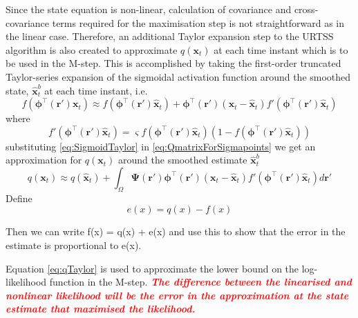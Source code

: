 \documentclass[]{article}
\newcommand{\dean}[1]{\textsf{\emph{\textbf{\textcolor{red}{#1}}}}}
\begin{document}
Since the state equation is non-linear,  calculation of covariance and  cross-covariance terms required for the maximisation step is not straightforward as in the linear case. Therefore, an additional  Taylor expansion step to the URTSS algorithm is also created to approximate $q(\mathbf{x}_t)$ at each time instant which is to be used in the M-step. This is accomplished by taking the first-order truncated Taylor-series expansion of the sigmoidal activation function  around the smoothed state, $\hat{\mathbf x}_t^{b}$ at each time instant, i.e.
\begin{equation}\label{eq:SigmoidTaylor}
 f\left(\boldsymbol \phi^\top\left(\mathbf r'\right)\mathbf x_t\right) \approx f\left(\boldsymbol \phi^\top(\mathbf r')\hat{\mathbf x}_t\right)+  \boldsymbol \phi^\top\left(\mathbf r'\right)\left(\mathbf x_t - \hat{\mathbf x}_t\right)f'\left(\boldsymbol \phi^\top\left(\mathbf r'\right)\hat{\mathbf x}_t\right)
\end{equation}
where 
\begin{equation}\label{eq:SigmoidDerivative}
 f'\left(\boldsymbol \phi^\top\left(\mathbf r'\right)\hat{\mathbf x}_t\right)=\varsigma f\left(\boldsymbol \phi^\top\left(\mathbf r'\right)\hat{\mathbf x}_t\right)\left( 1-f\left( \boldsymbol \phi^\top\left(\mathbf r'\right)\hat{\mathbf x}_t\right)\right)
\end{equation}
substituting \ref{eq:SigmoidTaylor} in \ref{eq:QmatrixForSigmapoints}  we get an approximation for $q(\mathbf x_t)$ around the smoothed estimate $\hat{\mathbf{x}}_t^b$ 
\begin{equation}\label{eq:qTaylor}
 q(\mathbf x_t) \approx q\left(\hat{\mathbf x}_t\right)+\int_\Omega \boldsymbol{\Psi}\left(\mathbf{r}'\right)\boldsymbol \phi^\top\left(\mathbf r'\right) \left(\mathbf x_t -\hat{\mathbf x}_t\right)f'\left(\boldsymbol \phi^\top\left(\mathbf r'\right)\hat{\mathbf x}_t\right) d\mathbf{r}'
\end{equation}
Define
\begin{equation}
	e(x) = q(x) - f(x) \nonumber
\end{equation}

Then we can write f(x) = q(x) + e(x) and use this to show that the error in the estimate is proportional to e(x).

Equation \ref{eq:qTaylor} is used to approximate the lower bound on the log-likelihood function in the M-step. \dean{The difference between the linearised and nonlinear likelihood will be the error in the approximation at the state estimate that maximised the likelihood.}
\end{document}
